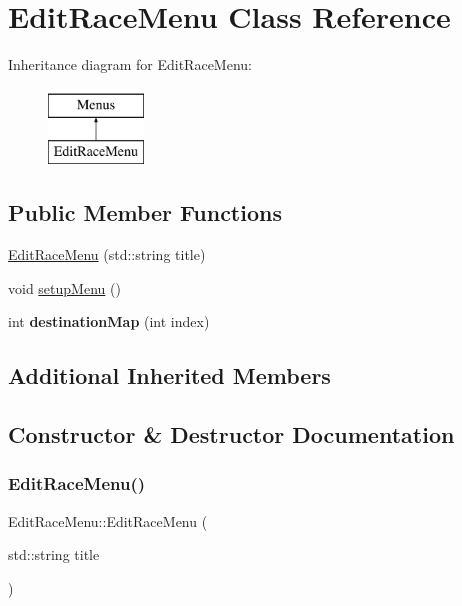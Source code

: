 \hypertarget{class_edit_race_menu}{}\section{Edit\+Race\+Menu Class Reference}
\label{class_edit_race_menu}
Inheritance diagram for Edit\+Race\+Menu\+:\begin{figure}[H]
\begin{center}
\leavevmode
\includegraphics[height=2.000000cm]{class_edit_race_menu}
\end{center}
\end{figure}
\subsection*{Public Member Functions}
\begin{DoxyCompactItemize}
\item 
\hyperlink{class_edit_race_menu_ad5f87005234bed0a1a93367130fa0ef9}{Edit\+Race\+Menu} (std\+::string title)
\item 
void \hyperlink{class_edit_race_menu_ad2d2cba34426c68f678b1c04cddd2aed}{setup\+Menu} ()
\item 
\hypertarget{class_edit_race_menu_a84579daca444d4a37741b21d3fb09be9}{}\label{class_edit_race_menu_a84579daca444d4a37741b21d3fb09be9} 
int {\bfseries destination\+Map} (int index)
\end{DoxyCompactItemize}
\subsection*{Additional Inherited Members}


\subsection{Constructor \& Destructor Documentation}
\hypertarget{class_edit_race_menu_ad5f87005234bed0a1a93367130fa0ef9}{}\label{class_edit_race_menu_ad5f87005234bed0a1a93367130fa0ef9} 
\subsubsection{\texorpdfstring{Edit\+Race\+Menu()}{EditRaceMenu()}}
{\footnotesize\ttfamily Edit\+Race\+Menu\+::\+Edit\+Race\+Menu (\begin{DoxyParamCaption}\item[{std\+::string}]{title }\end{DoxyParamCaption})}

